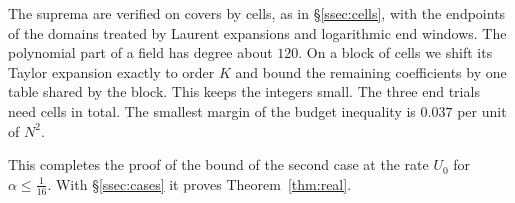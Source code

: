 The suprema are verified on covers by cells, as in \S\ref{ssec:cells}, with the endpoints of the domains
treated by Laurent expansions and logarithmic end windows. The polynomial part of a field has degree about
$120$. On a block of cells we shift its Taylor expansion exactly to order $K$ and bound the remaining
coefficients by one table shared by the block. This keeps the integers small. The three end trials need
\NcellsSigned{} cells in total. The smallest margin of the budget inequality is $0.037$ per unit of $N^2$.

This completes the proof of the bound of the second case at the rate $U_0$ for $\alpha\le\frac1{16}$. With
\S\ref{ssec:cases} it proves Theorem~\ref{thm:real}.
